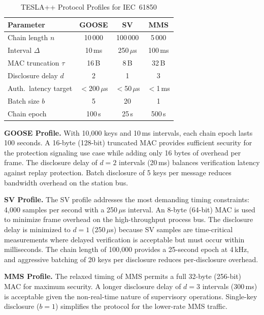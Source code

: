 \documentclass[conference,10pt]{IEEEtran}
\newcommand{\GOOSE}{\textsf{GOOSE}}
\newcommand{\SV}{\textsf{SV}}
\newcommand{\MMS}{\textsf{MMS}}
\begin{document}
\begin{table}[t]
\centering
\caption{TESLA++ Protocol Profiles for IEC~61850}
\label{tab:tesla_profiles}
\begin{tabular}{@{}lccc@{}}
\toprule
\textbf{Parameter} & \textbf{\GOOSE{}} & \textbf{\SV{}} & \textbf{\MMS{}} \\
\midrule
Chain length $n$       & 10\,000   & 100\,000  & 5\,000 \\
Interval $\Delta$      & 10\,ms    & 250\,$\mu$s & 100\,ms \\
MAC truncation $\tau$  & 16\,B     & 8\,B      & 32\,B \\
Disclosure delay $d$   & 2         & 1         & 3 \\
Auth.\ latency target  & $<$200\,$\mu$s & $<$50\,$\mu$s & $<$1\,ms \\
Batch size $b$         & 5         & 20        & 1 \\
Chain epoch            & 100\,s    & 25\,s     & 500\,s \\
\bottomrule
\end{tabular}
\end{table}

\textbf{GOOSE Profile.} With 10{,}000 keys and 10\,ms intervals, each chain epoch lasts 100 seconds. A 16-byte (128-bit) truncated MAC provides sufficient security for the protection signaling use case while adding only 16 bytes of overhead per frame. The disclosure delay of $d = 2$ intervals (20\,ms) balances verification latency against replay protection. Batch disclosure of 5 keys per message reduces bandwidth overhead on the station bus.

\textbf{SV Profile.} The \SV{} profile addresses the most demanding timing constraints: 4{,}000 samples per second with a 250\,$\mu$s interval. An 8-byte (64-bit) MAC is used to minimize frame overhead on the high-throughput process bus. The disclosure delay is minimized to $d = 1$ (250\,$\mu$s) because \SV{} samples are time-critical measurements where delayed verification is acceptable but must occur within milliseconds. The chain length of 100{,}000 provides a 25-second epoch at 4\,kHz, and aggressive batching of 20 keys per disclosure reduces per-disclosure overhead.

\textbf{MMS Profile.} The relaxed timing of \MMS{} permits a full 32-byte (256-bit) MAC for maximum security. A longer disclosure delay of $d = 3$ intervals (300\,ms) is acceptable given the non-real-time nature of supervisory operations. Single-key disclosure ($b = 1$) simplifies the protocol for the lower-rate \MMS{} traffic.
\end{document}
